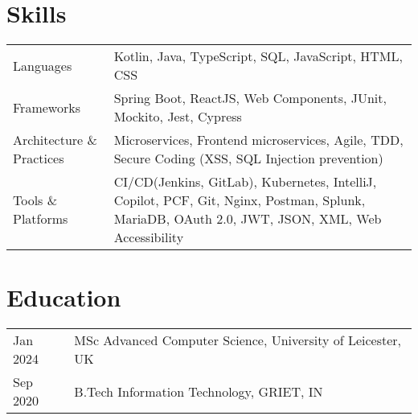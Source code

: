 \documentclass[a4paper,12pt]{article}
\begin{document}
\section{Skills}
\begin{tabularx}{\linewidth}{@{}l X@{}}
Languages & Kotlin, Java, TypeScript, SQL, JavaScript, HTML, CSS\\
Frameworks & Spring Boot, ReactJS, Web Components, JUnit, Mockito, Jest, Cypress\\
Architecture \& Practices & Microservices, Frontend microservices, Agile, TDD, Secure Coding (XSS, SQL Injection prevention) \\
Tools \& Platforms & CI/CD(Jenkins, GitLab), Kubernetes, IntelliJ, Copilot, PCF, Git, Nginx, Postman, Splunk, MariaDB, OAuth 2.0, JWT, JSON, XML, Web Accessibility \\
\end{tabularx}
\section{Education}
\begin{tabularx}{\linewidth}{@{}l X@{}} 	
Jan 2024 & MSc Advanced Computer Science, University of Leicester, UK \\
Sep 2020 & B.Tech Information Technology, GRIET, IN \\
\end{tabularx}
\end{document}
